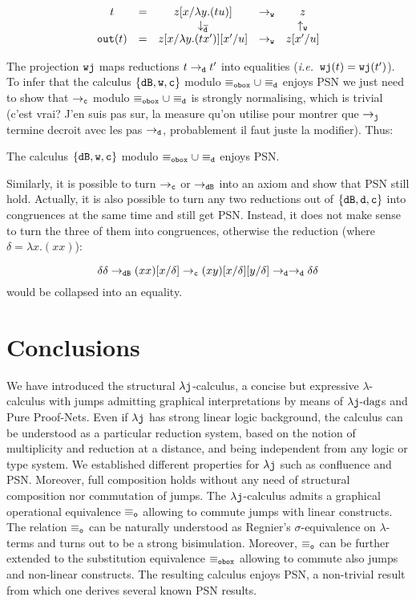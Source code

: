 \documentclass{LMCS}
\newcommand{\ie}{{\it  i.e.}~}
\renewcommand{\>}{\rightarrow}
\def\lam{\lambda}
\newcommand{\Rew}[1]{\rightarrow_{#1}}
\newcommand{\B}{{\tt dB}}
\newcommand{\dis}{{\tt j}}
\newcommand{\ldis}{\lam{\dis}}
\newcommand{\lj}{\lam{\dis}}
\newcommand{\ljdag}{\lam\jop\mbox{-dag}}
\newcommand{\proj}{\wfc}
\newcommand{\Var}{{\tt d}}
\newcommand{\DSubs}{{\tt c}}
\newcommand{\out}{{\tt out}}
\newcommand{\Gc}{{\tt w}}
\newcommand{\set}[1]{ \{ #1 \}}
\newcommand{\wfc}{\Gc\dis}
\newcommand{\jop}{{\tt j}}
\newcommand{\eqw}[1]{\equiv_{#1}}
\newcommand{\eqo}{\equiv_\osym}
\newcommand{\osym}{{\tt o}}
\newcommand{\fsymb}{\osymb\boite}
\newcommand{\osymb}{{\tt o}}
\newcommand{\eqf}{\eqw{\fsymb}}
\newcommand{\boite}{{\tt box}}
\begin{document}
{\[ \begin{array}{cccccccccc}
t&=&z[x/\lam y. (t u)]&\Rew{\Gc}& z\\
&&\downarrow_{\overline{\Var}}&&\uparrow_{\Gc}\\
\out(t)&=&z[x/\lam y. (t x')][x'/u]& \Rew{\Gc}&z[x'/u]\\
   \end{array} \]

The projection $\proj$ maps reductions $t\Rew{\Var}t'$ into equalities (\ie $\proj(t)=\proj(t')$). To infer that the calculus $\set{\B,\Gc,\DSubs}$ modulo $\eqf\cup\eqw{\Var}$ enjoys PSN we just need to show that $\Rew{\DSubs}$ modulo $\eqf\cup\eqw{\Var}$ is strongly normalising, which is trivial 
(c'est vrai? J'en suis pas sur, la measure qu'on utilise pour montrer que $\Rew{\dis}$ termine decroit avec les pas $\Rew{\Var}$, probablement il faut juste la modifier). Thus:

\begin{thm}
The calculus $\set{\B,\Gc,\DSubs}$ modulo $\eqf\cup\eqw{\Var}$ enjoys PSN.
\end{thm}

Similarly, it is possible to turn $\Rew{\DSubs}$ or $\Rew{\B}$ into 
an axiom and show that PSN still hold. Actually, it is also possible
to turn any two reductions out of $\set{\B,\Var,\DSubs}$ into
congruences at the same time and still get PSN. Instead, it does not
make sense to turn the three of them into congruences, otherwise the
reduction (where $\delta=\lam x. (x x)$):

$$\delta \delta\Rew{\B}(x x)[x/\delta]\Rew{\DSubs}(x y)[x/\delta][y/\delta]\Rew{\Var}\Rew{\Var}\delta \delta$$
would be collapsed into an equality.
}


\section{Conclusions}



We  have introduced  the  structural $\ldis$-calculus,  a concise  but
expressive   $\lam$-calculus  with  jumps   admitting
graphical interpretations  by means of $\ljdag$s  and Pure Proof-Nets.
Even if $\ldis$  has strong linear logic background,  the calculus can
be understood as a particular reduction system, based on the notion of
multiplicity and reduction at a distance, and being independent from
any  logic or  type system.  We established  different  properties for
$\ldis$ such as confluence  and PSN.  Moreover, full composition holds
without any  need of  structural composition nor  commutation of
jumps.  The $\lj$-calculus  admits a graphical operational equivalence
$\eqo$ allowing to commute jumps with linear constructs.  The relation
$\eqo$ can  be naturally understood  as Regnier's $\sigma$-equivalence
on $\lam$-terms  and turns out  to be a strong  bisimulation.  Moreover,
$\eqo$ can be further  extended to the substitution equivalence $\eqf$
allowing  to  commute  also  jumps  and  non-linear  constructs.   The
resulting  calculus enjoys PSN,  a non-trivial  result from  which one
derives several known PSN results.
\end{document}
